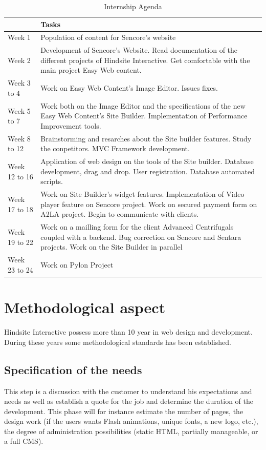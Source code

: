 \begin{table}[!h]
	\caption{\label{tableau:agenda}Internship Agenda}
	\begin{tabular}{ | l | p{12cm} | }
		\hline
		 & Tasks\\
		\hline
		Week 1	&	Population of content for Sencore's website\\	\hline
		Week 2	&	Development of Sencore's Website. Read documentation of the different projects of Hindsite Interactive. Get comfortable with the main project Easy Web content.\\	\hline
		Week 3 to 4	&	Work on Easy Web Content's Image Editor. Issues fixes.\\	\hline
		Week 5 to 7	&	Work both on the Image Editor and the specifications of the new Easy Web Content's Site Builder. Implementation of Performance Improvement tools.\\	\hline
		Week 8 to 12	&	Brainstorming and resarches about the Site builder features. Study the conpetitors. MVC Framework development.\\	\hline
		Week 12 to 16	&	Application of web design on the tools of the Site builder. Database development, drag and drop. User registration. Database automated scripts.	\\	\hline
		Week 17	to 18&	Work on Site Builder's widget features. Implementation of Video player feature on Sencore project. Work on secured payment form on A2LA project. Begin to communicate with clients.\\	\hline
		Week 19	to 22 &	Work on a mailling form for the client Advanced Centrifugals coupled with a backend. Bug correction on Sencore and Sentara projects. Work on the Site Builder in parallel\\	\hline
		Week 23	to 24&	Work on Pylon Project\\	\hline
	\end{tabular}
\end{table}

\section{Methodological aspect}

Hindsite Interactive possess more than 10 year in web design and development. During these years 
some methodological standards has been established.

\subsection{Specification of the needs}
This step is a discussion with the customer to understand his expectations
and needs as well as establish a quote for the job and determine the duration
of the development.
This phase will for instance estimate the number of pages, the design work (if
the users wants Flash animations, unique fonts, a new logo, etc.), the degree
of administration possibilities (static HTML, partially manageable, or a full
CMS).

